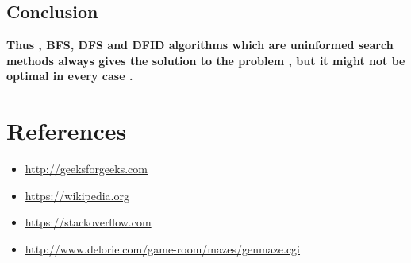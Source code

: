 \documentclass{article}
\begin{document}
\subsection*{Conclusion}
\textbf{Thus , BFS, DFS and DFID algorithms which are uninformed search methods always gives the solution to the problem , but it might not be optimal in every case .}
\newpage
\section{References}
\vspace{30pt}
\begin{itemize}
    \item \url{http://geeksforgeeks.com}
    \item \url{https://wikipedia.org}
    \item \url{https://stackoverflow.com}
    \item \url{http://www.delorie.com/game-room/mazes/genmaze.cgi}
\end{itemize}
\end{document}
